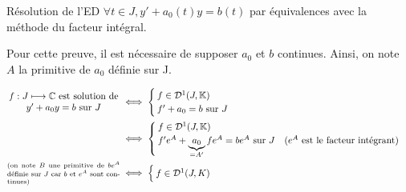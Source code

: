 \documentclass{article}
\date{10 novembre 2023}
\begin{document}
\maketitle

\begin{question_kholle}{Résolution de l'ED  $\forall t \in J, y' + a_{0}(t)y = b(t)$ par équivalences avec la méthode du facteur intégral.}

	Pour cette preuve, il est nécessaire de supposer $a_{0}$ et $b$ continues.
	Ainsi, on note $A$ la primitive de $a_{0}$ définie sur J.

	\begin{align*}
		\parbox{12em}{\centering$f:J\longmapsto\C$ est solution de $y'+a_{0}y=b$ sur $J$}                                     & \iff \begin{cases}
			                                                                                                                             f \in \mathcal{D}^1(J,\K) \\
			                                                                                                                             f'+ a_0 = b \text{ sur } J
		                                                                                                                             \end{cases}                                                                                                                                         \\
		                                                                                                                      & \iff \begin{cases}
			                                                                                                                             f\in\mathcal{D}^1(J,\K) \\
			                                                                                                                             f' e^{A} + \underbrace{a_{0}}_{=A'}f e^{A} = b e^{A} \text{ sur } J \quad\text{($e^{A}$ est le facteur intégrant)}
		                                                                                                                             \end{cases} \\
		\parbox{12em}{\scriptsize (on note $B$ une primitive de $b e^{A}$ définie sur $J$ car $b$ et $e^{A}$ sont continues)} & \iff \begin{cases}
			                                                                                                                             f\in\mathcal{D}^1(J,K) \\

\end{cases}
\end{align*}
\end{question_kholle}
\end{document}
